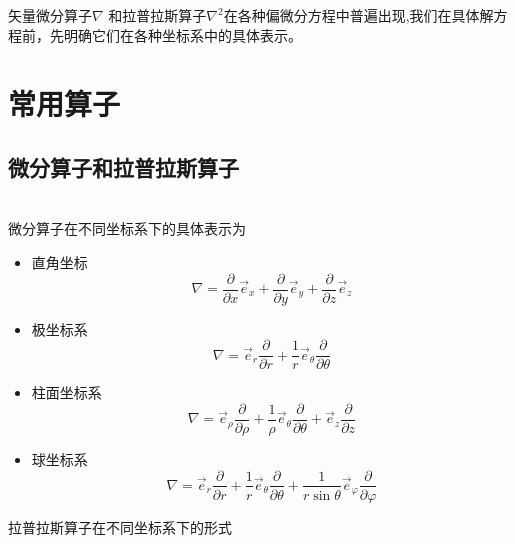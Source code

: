 矢量微分算子$\nabla$ 和拉普拉斯算子$\nabla^2$在各种偏微分方程中普遍出现,我们在具体解方程前，先明确它们在各种坐标系中的具体表示。

\section{常用算子}
\subsection{微分算子和拉普拉斯算子} ~\\

微分算子在不同坐标系下的具体表示为
\begin{itemize}
	\item 直角坐标 \begin{equation}\nabla=\frac{\partial}{\partial x} \vec{e}_x+\frac{\partial}{\partial y} \vec{e}_y+\frac{\partial}{\partial z} \vec{e}_z
	\end{equation}
	\item 极坐标系 \begin{equation}
	  \nabla =\vec{e}_{r} \frac{\partial}{\partial r}+\frac{1}{r} \vec{e}_{\theta} \frac{\partial}{\partial \theta}
	\end{equation}
	\item 柱面坐标系\begin{equation}
	  \nabla =\vec{e}_{\rho} \frac{\partial}{\partial \rho}+\frac{1}{\rho} \vec{e}_{\theta} \frac{\partial}{\partial \theta} + \vec{e}_{z} \frac{\partial}{\partial z}
	\end{equation}
	\item 球坐标系
	\begin{equation}
		\nabla =\vec{e}_{r} \frac{\partial}{\partial r}+\frac{1}{r} \vec{e}_{\theta} \frac{\partial}{\partial \theta}+\frac{1}{r \sin \theta} \vec{e}_{\varphi} \frac{\partial}{\partial \varphi}
	\end{equation}
	\end{itemize}
拉普拉斯算子在不同坐标系下的形式 
